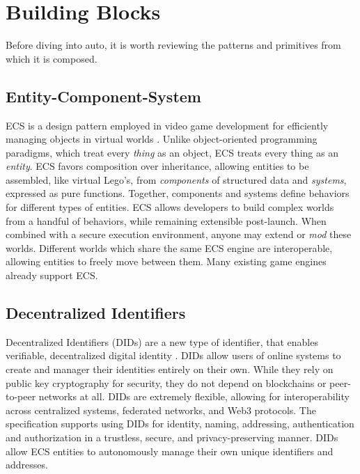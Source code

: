 \documentclass[twocolumn, 10pt]{article}
\begin{document}
\section{Building Blocks}
Before diving into auto, it is worth reviewing the patterns and primitives from which it is composed. 

\subsection{Entity-Component-System}
ECS is a design pattern employed in video game development for efficiently managing objects in virtual worlds \cite{Entitiies}. Unlike object-oriented programming paradigms, which treat every \textit{thing} as an object, ECS treats every thing as an \textit{entity}. ECS favors composition over inheritance, allowing entities to be assembled, like virtual Lego's, from \textit{components} of structured data and \textit{systems}, expressed as pure functions. Together, components and systems define behaviors for different types of entities. ECS allows developers to build complex worlds from a handful of behaviors, while remaining extensible post-launch. When combined with a secure execution environment, anyone may extend or \textit{mod} these worlds. Different worlds which share the same ECS engine are interoperable, allowing entities to freely move between them. Many existing game engines already support ECS. 

\subsection{Decentralized Identifiers}
Decentralized Identifiers (DIDs)  are a new type of identifier, that enables verifiable, decentralized digital identity \cite{reed2020decentralized}. DIDs allow users of online systems to create and manager their identities entirely on their own. While they rely on public key cryptography for security, they do not depend on blockchains or peer-to-peer networks at all. DIDs are extremely flexible, allowing for interoperability across centralized systems, federated networks, and Web3 protocols. The specification supports using DIDs for identity, naming, addressing, authentication and authorization in a trustless, secure, and privacy-preserving manner. DIDs allow ECS entities to autonomously manage their own unique identifiers and addresses. 
\end{document}
